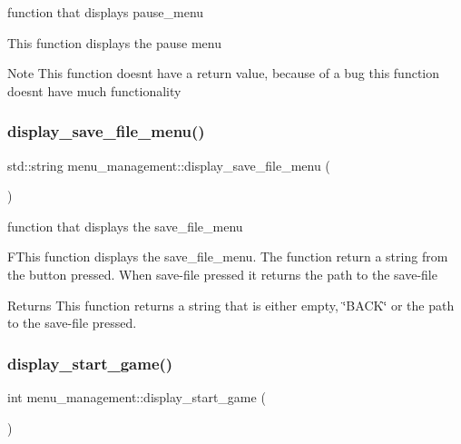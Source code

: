 function that displays pause\+\_\+menu 

This function displays the pause menu

\begin{DoxyNote}{Note}
This function doesn\textquotesingle{}t have a return value, because of a bug this function doesn\textquotesingle{}t have much functionality 
\end{DoxyNote}
\mbox{\label{classmenu__management_ac64c1eace3d955be8623a1129597dc54}} 
\subsubsection{\texorpdfstring{display\+\_\+save\+\_\+file\+\_\+menu()}{display\_save\_file\_menu()}}
{\footnotesize\ttfamily std\+::string menu\+\_\+management\+::display\+\_\+save\+\_\+file\+\_\+menu (\begin{DoxyParamCaption}{ }\end{DoxyParamCaption})}



function that displays the save\+\_\+file\+\_\+menu 

F\+This function displays the save\+\_\+file\+\_\+menu. The function return a string from the button pressed. When save-\/file pressed it returns the path to the save-\/file

\begin{DoxyReturn}{Returns}
This function returns a string that is either empty, \char`\"{}\+B\+A\+C\+K\char`\"{} or the path to the save-\/file pressed. 
\end{DoxyReturn}
\mbox{\label{classmenu__management_aad6e975e03cab2478f3ebec8da7eaf7d}} 
\subsubsection{\texorpdfstring{display\+\_\+start\+\_\+game()}{display\_start\_game()}}
{\footnotesize\ttfamily int menu\+\_\+management\+::display\+\_\+start\+\_\+game (\begin{DoxyParamCaption}{ }\end{DoxyParamCaption})}



